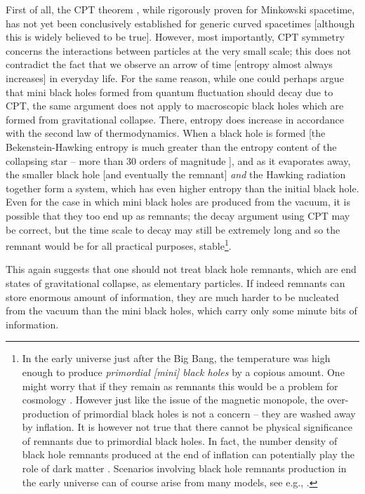 \documentclass[12pt]{article}
\newcommand{\2}{$^2$}
\newcommand{\3}{$^3$}
\newcommand{\4}{$_4$}
\newcommand{\5}{$_5$}
\begin{document}
First of all, the CPT theorem \cite{gerhart}, while rigorously proven for Minkowski spacetime, has not yet been conclusively established for generic curved spacetimes [although this is widely believed to be true]. However, most importantly, CPT symmetry concerns the interactions between particles at the very small scale; this does not contradict the fact that we observe an arrow of time [entropy almost always increases] in everyday life. For the same reason, while one could perhaps argue that mini black holes formed from quantum fluctuation should decay due to CPT, the same argument does not apply to macroscopic black holes which are formed from gravitational collapse. There, entropy does increase in accordance with the second law of thermodynamics. When a black hole is formed [the Bekenstein-Hawking entropy is much greater than the entropy content of the collapsing star -- more than 30 orders of magnitude \cite{clarify}], and as it evaporates away, the smaller black hole [and eventually the remnant] \emph{and} the Hawking radiation together form a system, which has even higher entropy than the initial black hole. Even for the case in which mini black holes are produced from the vacuum, it is possible that they too end up as remnants; the decay argument using CPT may be correct, but the time scale to decay may still be extremely long and so the remnant would be for all practical purposes, stable\footnote{In the early universe just after the Big Bang, the temperature was high enough to produce \emph{primordial [mini] black holes} \cite{carr} by a copious amount. One might worry that if they remain as remnants this would be a problem for cosmology \cite{tegmark}. However just like the issue of  the magnetic monopole, the over-production of primordial black holes is not a concern -- they are washed away by inflation. It is however not true that there cannot be physical significance of remnants due to primordial black holes. In fact, the number density of black hole remnants produced at the end of inflation can potentially play the role of dark matter \cite{pisinDM}. {\color{black} Scenarios involving black hole remnants production in the early universe can  of course arise from many models, see e.g., \cite{1102.5096}.}}. 

This again suggests that one should not treat black hole remnants, which are end states of gravitational collapse, as elementary particles. If indeed remnants can store enormous amount of information, they are much harder to be nucleated from the vacuum than the mini black holes, which carry only some minute bits of information. 
\end{document}
